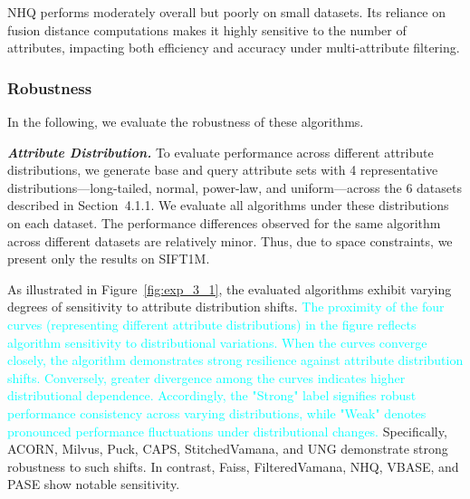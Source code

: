 \documentclass[sigconf, nonacm]{acmart}
\begin{document}
	
	NHQ performs moderately overall but poorly on small datasets. Its reliance on fusion distance computations makes it highly sensitive to the number of attributes, impacting both efficiency and accuracy under multi-attribute filtering.
	
	
	
	
	\subsubsection{Robustness}In the following, we evaluate the robustness of these algorithms.
	
	\textit{\textbf{Attribute Distribution.}} To evaluate performance across different attribute distributions, we generate base and query attribute sets with 4 representative distributions—long-tailed, normal, power-law, and uniform—across the 6 datasets described in Section~4.1.1. We evaluate all algorithms under these distributions on each dataset. The performance differences observed for the same algorithm across different datasets are relatively minor. Thus, due to space constraints, we present only the results on SIFT1M.
	
	As illustrated in Figure~\ref{fig:exp_3_1}, the evaluated algorithms exhibit varying degrees of sensitivity to attribute distribution shifts. \textcolor{cyan}{The proximity of the four curves (representing different attribute distributions) in the figure reflects algorithm sensitivity to distributional variations. When the curves converge closely, the algorithm demonstrates strong resilience against attribute distribution shifts. Conversely, greater divergence among the curves indicates higher distributional dependence. Accordingly, the "Strong" label signifies robust performance consistency across varying distributions, while "Weak" denotes pronounced performance fluctuations under distributional changes.} Specifically, ACORN, Milvus, Puck, CAPS, StitchedVamana, and UNG demonstrate strong robustness to such shifts. In contrast, Faiss, FilteredVamana, NHQ, VBASE, and PASE show notable sensitivity.
	
\end{document}
